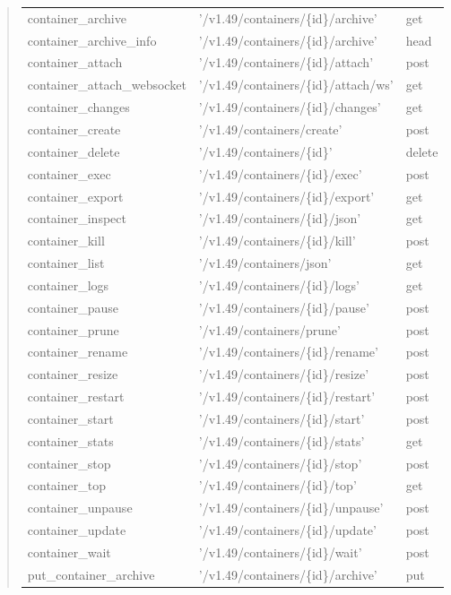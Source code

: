 \begin{description}
\begin{quote}
\begin{tabulary}{0.9\textwidth}{|l|L|l|}
\hline
container_archive & '/v1.49/containers/\{id\}/archive' & get \\
container_archive_info & '/v1.49/containers/\{id\}/archive' & head \\
container_attach & '/v1.49/containers/\{id\}/attach' & post \\
container_attach_websocket & '/v1.49/containers/\{id\}/attach/ws' & get \\
container_changes & '/v1.49/containers/\{id\}/changes' & get \\
container_create & '/v1.49/containers/create' & post \\
container_delete & '/v1.49/containers/\{id\}' & delete \\
container_exec & '/v1.49/containers/\{id\}/exec' & post \\
container_export & '/v1.49/containers/\{id\}/export' & get \\
container_inspect & '/v1.49/containers/\{id\}/json' & get \\
container_kill & '/v1.49/containers/\{id\}/kill' & post \\
container_list & '/v1.49/containers/json' & get \\
container_logs & '/v1.49/containers/\{id\}/logs' & get \\
container_pause & '/v1.49/containers/\{id\}/pause' & post \\
container_prune & '/v1.49/containers/prune' & post \\
container_rename & '/v1.49/containers/\{id\}/rename' & post \\
container_resize & '/v1.49/containers/\{id\}/resize' & post \\
container_restart & '/v1.49/containers/\{id\}/restart' & post \\
container_start & '/v1.49/containers/\{id\}/start' & post \\
container_stats & '/v1.49/containers/\{id\}/stats' & get \\
container_stop & '/v1.49/containers/\{id\}/stop' & post \\
container_top & '/v1.49/containers/\{id\}/top' & get \\
container_unpause & '/v1.49/containers/\{id\}/unpause' & post \\
container_update & '/v1.49/containers/\{id\}/update' & post \\
container_wait & '/v1.49/containers/\{id\}/wait' & post \\
put_container_archive & '/v1.49/containers/\{id\}/archive' & put \\
\hline
\end{tabulary}
\end{quote}


\end{description}
